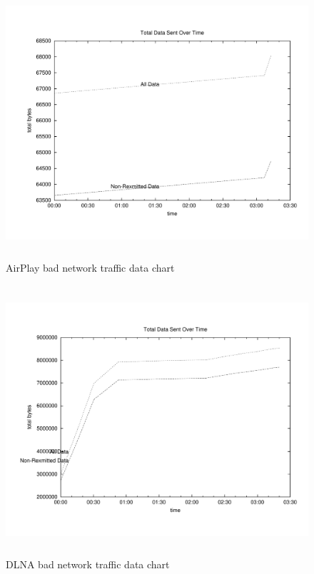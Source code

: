 \begin{figure}[htb]
\centering \includegraphics[height=10cm]{charts/airplay_traffic_10loss_data}
\caption{AirPlay bad network traffic data chart \label{chart6}}
\end{figure}
\begin{figure}[htb]
\centering \includegraphics[height=10cm]{charts/dlna_traffic_10loss_data}
\caption{DLNA bad network traffic data chart \label{chart6}}
\end{figure}


